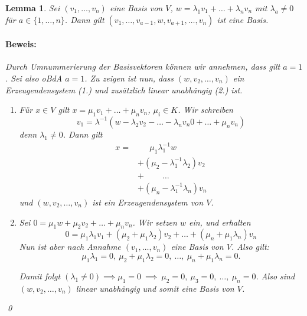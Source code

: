\documentclass{report}
\newcommand{\lb}{\lambda}
\theoremstyle{customrem}
\theoremstyle{customdef}
\newtheorem{lemma}[definition]{Lemma}
\renewenvironment{proof}{\paragraph{Beweis: }}{\qed}
\theoremstyle{customenv}
\begin{document}
	\begin{lemma}
		\label{lem214}
		Sei \((v_1, \dots, v_n)\) eine Basis von \(V\), \(w = \lb_1v_1 + \dots +  \lb_n v_n\) mit \(\lb_a \neq 0\) für \(a \in \{1, \dots, n\}\). Dann gilt \((v_1, \dots, v_{a - 1}, w, v_{a+1}, \dots, v_n)\) ist eine Basis.
		
		\begin{proof}
			Durch Umnummerierung der Basisvektoren können wir annehmen, dass gilt \(a = 1\). Sei also oBdA \(a = 1\). Zu zeigen ist nun, dass \((w, v_2, \dots, v_n)\) ein Erzeugendensystem (1.) und zusätzlich linear unabhängig (2.) ist.
			\begin{enumerate}
				\item Für \(x \in V\) gilt \(x = \mu_1 v_1 + \ldots + \mu_n v_n\), \(\mu_i \in K\). Wir schreiben
				\[v_1 = \lb^{-1}(w-\lb_2 v_2 - \ldots - \lb_n v_n0 + \ldots + \mu_n v_n)\] denn \(\lb_1\not=0\). Dann gilt
				\begin{align*}
				x =&\quad \ \ \mu_1\lb_1^{-1}w\\
				&+(\mu_2-\lb_1^{-1}\lb_2)v_2\\
				&+\qquad\ \ldots\\
				&+(\mu_n-\lb_1^{-1}\lb_n)v_n
				\end{align*}
				und \((w, v_2, \dots, v_n)\) ist ein Erzeugendensystem von \(V\).
				\item Sei \(0 = \mu_1 w + \mu_2 v_2 + \ldots + \mu_n v_n\). Wir setzen \(w\) ein, und erhalten
				\[0 = \mu_1 \lb_1 v_1 + (\mu_2  + \mu_1 \lb_2) v_2 + \ldots + (\mu_n + \mu_1 \lb_n)v_n\]
				Nun ist aber nach Annahme \((v_1, \ldots, v_n)\) eine Basis von \(V\). Also gilt: \[\mu_1\lb_1 = 0,\ \mu_2  + \mu_1 \lb_2=0,\ \ldots ,\ \mu_n + \mu_1 \lb_n = 0.\]  
				
				Damit folgt \((\lb_1 \neq 0) \implies \mu_1 = 0\ \implies \ \mu_2=0,\ \mu_3=0,\ \ldots ,\ \mu_n=0\). Also sind \((w, v_2, \dots, v_n)\) linear unabhängig und somit eine Basis von \(V\).
			\end{enumerate}
		\end{proof}	
	\end{lemma}
	
\end{document}
